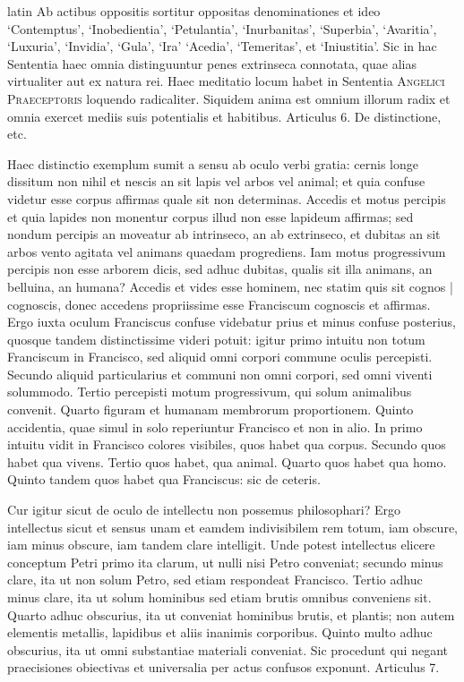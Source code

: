 \begin{otherlanguage*}{latin}
\pstart
 Ab actibus oppositis sortitur oppositas denominationes et ideo `Contemptus', `Inobedientia', `Petulantia', `Inurbanitas', `Superbia', `Avaritia', `Luxuria', `Invidia', `Gula', `Ira' `Acedia', `Temeritas', et `Iniustitia'. Sic in hac Sententia haec omnia distinguuntur penes extrinseca connotata, quae alias virtualiter aut ex natura rei. Haec meditatio locum habet in Sententia \textsc{Angelici Praeceptoris} loquendo radicaliter. Siquidem anima est omnium illorum radix et omnia exercet mediis suis potentialis et habitibus. Articulus 6. De distinctione, etc. 
\pend

        \pstart
        \pend
      
\pstart
 Haec distinctio exemplum sumit a sensu ab oculo verbi gratia: cernis longe dissitum non nihil et nescis an sit lapis vel arbos vel animal; et quia confuse videtur esse corpus affirmas quale sit non determinas. Accedis et motus percipis et quia lapides non monentur corpus illud non esse lapideum affirmas; sed nondum percipis an moveatur ab intrinseco, an ab extrinseco, et dubitas an sit arbos vento agitata vel animans quaedam progrediens. Iam motus progressivum percipis non esse arborem dicis, sed adhuc dubitas, qualis sit illa animans, an belluina, an humana? Accedis et vides esse hominem, nec statim quis sit cognos \textnormal{|}   cognoscis, donec accedens propriissime esse Franciscum cognoscis et affirmas. Ergo iuxta oculum Franciscus confuse videbatur prius et minus confuse posterius, quosque tandem distinctissime videri potuit: igitur primo intuitu non totum Franciscum in Francisco, sed aliquid omni corpori commune oculis percepisti. Secundo aliquid particularius et communi non omni corpori, sed omni viventi solummodo. Tertio percepisti motum progressivum, qui solum animalibus convenit. Quarto figuram et humanam membrorum proportionem. Quinto accidentia, quae simul in solo reperiuntur Francisco et non in alio. In primo intuitu vidit in Francisco colores visibiles, quos habet qua corpus. Secundo quos habet qua vivens. Tertio quos habet, qua animal. Quarto quos habet qua homo. Quinto tandem quos habet qua Franciscus: sic de ceteris. 
\pend

\pstart
 Cur igitur sicut de oculo de intellectu non possemus philosophari? Ergo intellectus sicut et sensus unam et eamdem indivisibilem rem totum, iam obscure, iam minus obscure, iam tandem clare intelligit. Unde potest intellectus elicere conceptum Petri primo ita clarum, ut nulli nisi Petro conveniat; secundo minus clare, ita ut non solum Petro, sed etiam respondeat Francisco. Tertio adhuc minus clare, ita ut solum hominibus sed etiam brutis omnibus conveniens sit. Quarto adhuc obscurius, ita ut conveniat hominibus brutis, et plantis; non autem elementis metallis, lapidibus et aliis inanimis corporibus. Quinto multo adhuc obscurius, ita ut omni substantiae materiali conveniat. Sic procedunt qui negant praecisiones obiectivas et universalia per actus confusos exponunt. Articulus 7. 
\pend


\end{otherlanguage*}
